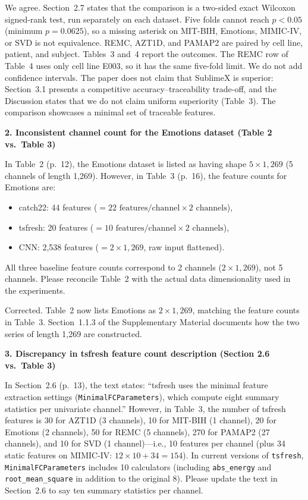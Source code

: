 \documentclass[11pt]{article}
\makeatletter
\newcommand{\rsp}{\par\vspace{0.9em}}
\newcommand{\rcitem}[2]{\begin{reviewerbox}\textbf{#1}\par\smallskip#2\end{reviewerbox}}
\newcommand{\response}[2]{%
  \begin{responsebox}#1%
  \def\@responseitems{#2}%
  \ifx\@responseitems\empty\else\begin{itemize}[nosep,leftmargin=1.2em]#2\end{itemize}\fi
  \end{responsebox}\rsp}
\makeatother
\begin{document}
\response{We agree. Section~2.7 states that the comparison is a two-sided exact Wilcoxon signed-rank test, run separately on each dataset. Five folds cannot reach $p<0.05$ (minimum $p=0.0625$), so a missing asterisk on MIT-BIH, Emotions, MIMIC-IV, or SVD is not equivalence. REMC, AZT1D, and PAMAP2 are paired by cell line, patient, and subject. Tables~3 and~4 report the outcomes. The REMC row of Table~4 uses only cell line E003, so it has the same five-fold limit. We do not add confidence intervals. The paper does not claim that SublimeX is superior: Section~3.1 presents a competitive accuracy--traceability trade-off, and the Discussion states that we do not claim uniform superiority (Table~3). The comparison showcases a minimal set of traceable features.}{}

\rcitem{2. Inconsistent channel count for the Emotions dataset (Table 2 vs.\ Table 3)}{In Table~2 (p.~12), the Emotions dataset is listed as having shape $5 \times 1{,}269$ (5 channels of length 1,269). However, in Table~3 (p.~16), the feature counts for Emotions are:
\begin{itemize}[nosep,leftmargin=1.4em]
  \item catch22: 44 features ($= 22 \text{ features/channel} \times 2 \text{ channels}$),
  \item tsfresh: 20 features ($= 10 \text{ features/channel} \times 2 \text{ channels}$),
  \item CNN: 2,538 features ($= 2 \times 1{,}269$, raw input flattened).
\end{itemize}
All three baseline feature counts correspond to 2 channels ($2 \times 1{,}269$), not 5 channels. Please reconcile Table~2 with the actual data dimensionality used in the experiments.}

\response{Corrected. Table~2 now lists Emotions as $2 \times 1{,}269$, matching the feature counts in Table~3. Section~1.1.3 of the Supplementary Material documents how the two series of length 1,269 are constructed.}{}

\rcitem{3. Discrepancy in tsfresh feature count description (Section 2.6 vs.\ Table 3)}{In Section~2.6 (p.~13), the text states: ``tsfresh uses the minimal feature extraction settings (\texttt{MinimalFCParameters}), which compute eight summary statistics per univariate channel.'' However, in Table~3, the number of tsfresh features is 30 for AZT1D (3 channels), 10 for MIT-BIH (1 channel), 20 for Emotions (2 channels), 50 for REMC (5 channels), 270 for PAMAP2 (27 channels), and 10 for SVD (1 channel)---i.e., 10 features per channel (plus 34 static features on MIMIC-IV: $12 \times 10 + 34 = 154$). In current versions of \texttt{tsfresh}, \texttt{MinimalFCParameters} includes 10 calculators (including \texttt{abs\_energy} and \texttt{root\_mean\_square} in addition to the original 8). Please update the text in Section~2.6 to say ten summary statistics per channel.}
\end{document}
